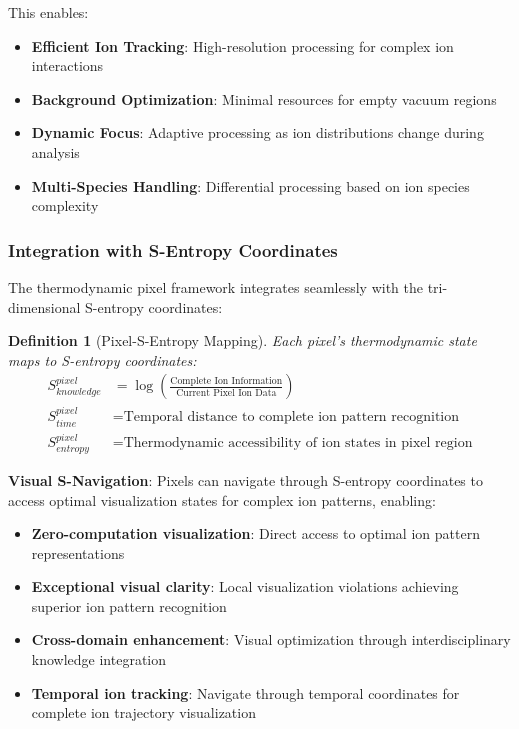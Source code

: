 \documentclass[11pt,a4paper]{article}
\newtheorem{definition}[theorem]{Definition}
\theoremstyle{remark}
\begin{document}
This enables:
\begin{itemize}
\item \textbf{Efficient Ion Tracking}: High-resolution processing for complex ion interactions
\item \textbf{Background Optimization}: Minimal resources for empty vacuum regions
\item \textbf{Dynamic Focus}: Adaptive processing as ion distributions change during analysis
\item \textbf{Multi-Species Handling}: Differential processing based on ion species complexity
\end{itemize}

\subsubsection{Integration with S-Entropy Coordinates}

The thermodynamic pixel framework integrates seamlessly with the tri-dimensional S-entropy coordinates:

\begin{definition}[Pixel-S-Entropy Mapping]
Each pixel's thermodynamic state maps to S-entropy coordinates:
\begin{align}
S_{knowledge}^{pixel} &= \log\left(\frac{\text{Complete Ion Information}}{\text{Current Pixel Ion Data}}\right)\\
S_{time}^{pixel} &= \text{Temporal distance to complete ion pattern recognition}\\
S_{entropy}^{pixel} &= \text{Thermodynamic accessibility of ion states in pixel region}
\end{align}
\end{definition}

\textbf{Visual S-Navigation}: Pixels can navigate through S-entropy coordinates to access optimal visualization states for complex ion patterns, enabling:
\begin{itemize}
\item \textbf{Zero-computation visualization}: Direct access to optimal ion pattern representations
\item \textbf{Exceptional visual clarity}: Local visualization violations achieving superior ion pattern recognition
\item \textbf{Cross-domain enhancement}: Visual optimization through interdisciplinary knowledge integration
\item \textbf{Temporal ion tracking}: Navigate through temporal coordinates for complete ion trajectory visualization
\end{itemize}
\end{document}
